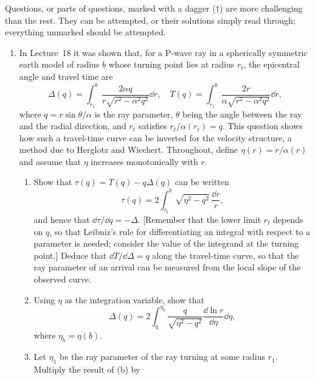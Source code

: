 \providecommand{\hardq}{\refstepcounter{enumi}\item[\labelenumi$^{\dagger}$]}
\providecommand{\hardp}{\refstepcounter{enumii}\item[\labelenumii$^{\dagger}$]}
\noindent Questions, or parts of questions, marked with a dagger ($\dagger$) are more challenging than the rest. They can be attempted, or their solutions simply read through; everything unmarked should be attempted.

\begin{enumerate}

\item In Lecture~18 it was shown that, for a P-wave ray in a spherically symmetric earth model of radius $b$ whose turning 
point lies at radius $r_{t}$, the epicentral angle and travel time are
\begin{equation*}
    \Delta(q)=\int_{r_{t}}^{b}\frac{2\alpha q}{r\sqrt{r^{2}-\alpha^{2}q^{2}}}\dd r, \quad 
    T(q)=\int_{r_{t}}^{b}\frac{2r}{\alpha\sqrt{r^{2}-\alpha^{2}q^{2}}}\dd r,
\end{equation*}
where $q=r\sin\theta/\alpha$ is the ray parameter, $\theta$ being the angle between the ray and the radial direction, and $r_{t}$ satisfies $r_{t}/\alpha(r_{t})=q$. This question 
shows how such a travel-time curve can be inverted for the velocity structure, a method due to Herglotz and Wiechert. Throughout, 
define $\eta(r)=r/\alpha(r)$ and assume that $\eta$ increases monotonically with $r$.
\begin{enumerate}
\item Show that $\tau(q)=T(q)-q\Delta(q)$ can be written
\begin{equation*}
    \tau(q)=2\int_{r_{t}}^{b}\sqrt{\eta^{2}-q^{2}}\,\frac{\dd r}{r},
\end{equation*}
and hence that $\dd\tau/\dd q=-\Delta$. [Remember that the lower limit $r_{t}$ depends on $q$, so that Leibniz's rule for differentiating an integral with respect to a parameter is needed; consider the value of the integrand at the turning point.] Deduce that $\dd T/\dd\Delta=q$ along the travel-time curve, so that the ray parameter of 
an arrival can be measured from the local slope of the observed curve.
\item Using $\eta$ as the integration variable, show that
\begin{equation*}
    \Delta(q)=2\int_{q}^{\eta_{b}}\frac{q}{\sqrt{\eta^{2}-q^{2}}}\frac{\dd\ln r}{\dd\eta}\dd\eta,
\end{equation*}
where $\eta_{b}=\eta(b)$.
\hardp Let $\eta_{1}$ be the ray parameter of the ray turning at some radius $r_{1}$. Multiply the result of (b) by 

\end{enumerate}
\end{enumerate}
